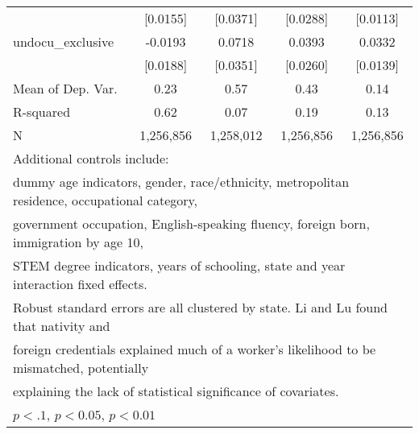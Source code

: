 \begin{table}[htbp]
\begin{tabular}{l*{4}{c}}
                    &    [0.0155]         &    [0.0371]         &    [0.0288]         &    [0.0113]         \\
\addlinespace
undocu\_exclusive    &     -0.0193         &      0.0718\sym{**} &      0.0393         &      0.0332\sym{**} \\
                    &    [0.0188]         &    [0.0351]         &    [0.0260]         &    [0.0139]         \\
\midrule
Mean of Dep. Var.   &        0.23         &        0.57         &        0.43         &        0.14         \\
R-squared           &        0.62         &        0.07         &        0.19         &        0.13         \\
N                   &   1,256,856         &   1,258,012         &   1,256,856         &   1,256,856         \\
\bottomrule
\multicolumn{5}{l}{\footnotesize Additional controls include:}\\
\multicolumn{5}{l}{\footnotesize dummy age indicators, gender, race/ethnicity, metropolitan residence, occupational category,}\\
\multicolumn{5}{l}{\footnotesize government occupation, English-speaking fluency, foreign born, immigration by age 10,}\\
\multicolumn{5}{l}{\footnotesize STEM degree indicators, years of schooling, state and year interaction fixed effects.}\\
\multicolumn{5}{l}{\footnotesize Robust standard errors are all clustered by state. Li and Lu found that nativity and}\\
\multicolumn{5}{l}{\footnotesize foreign credentials explained much of a worker's likelihood to be mismatched, potentially}\\
\multicolumn{5}{l}{\footnotesize explaining the lack of statistical significance of covariates.}\\
\multicolumn{5}{l}{\footnotesize \sym{*} \(p<.1\), \sym{**} \(p<0.05\), \sym{***} \(p<0.01\)}\\
\end{tabular}
\end{table}
